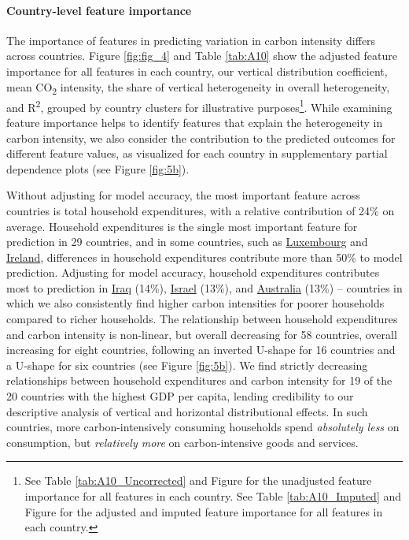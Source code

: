 \documentclass[12pt, a4paper]{article}
\begin{document}
\paragraph{Country-level feature importance}
The importance of features in predicting variation in carbon intensity differs across countries. Figure \ref{fig:fig_4} and Table \ref{tab:A10} show the adjusted feature importance for all features in each country, our vertical distribution coefficient, mean CO\textsubscript{2} intensity, the share of vertical heterogeneity in overall heterogeneity, and R\textsuperscript{2}, grouped by country clusters for illustrative purposes\footnote{See Table \ref{tab:A10_Uncorrected} and Figure  for the unadjusted feature importance for all features in each country. See Table \ref{tab:A10_Imputed} and Figure  for the adjusted and imputed feature importance for all features in each country.}. While examining feature importance helps to identify features that explain the heterogeneity in carbon intensity, we also consider the contribution to the predicted outcomes for different feature values, as visualized for each country in supplementary partial dependence plots (see Figure \ref{fig:5b}).

Without adjusting for model accuracy, the most important feature across countries is total household expenditures, with a relative contribution of 24\% on average. Household expenditures is the single most important feature for prediction in 29 countries, and in some countries, such as \hyperref[fig:5b_LUX]{Luxembourg} and \hyperref[fig:5b_IRL]{Ireland}, differences in household expenditures contribute more than 50\% to model prediction. Adjusting for model accuracy, household expenditures contributes most to prediction in \hyperref[fig:5b_IRQ]{Iraq} (14\%), \hyperref[fig:5b_ISR]{Israel} (13\%), and \hyperref[fig:5b_AUS]{Australia} (13\%) -- countries in which we also consistently find higher carbon intensities for poorer households compared to richer households. The relationship between household expenditures and carbon intensity is non-linear, but overall decreasing for 58 countries, overall increasing for eight countries, following an inverted U-shape for 16 countries and a U-shape for six countries (see Figure \ref{fig:5b}). We find strictly decreasing relationships between household expenditures and carbon intensity for 19 of the 20 countries with the highest GDP per capita, lending credibility to our descriptive analysis of vertical and horizontal distributional effects. In such countries, more carbon-intensively consuming households spend \textit{absolutely less} on consumption, but \textit{relatively more} on carbon-intensive goods and services.
\end{document}
